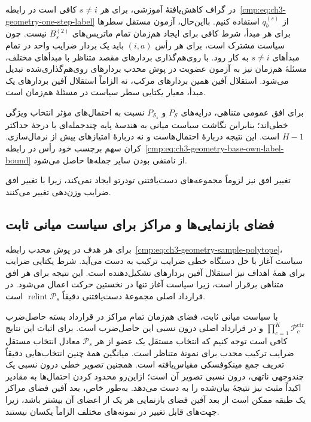 در گراف کاهش‌یافتهٔ آموزشی، برای هر $s\ne i$ کافی است در رابطه~\eqref{cmp:eq:ch3-geometry-one-step-label} از $q_b^{(s)}$ استفاده کنیم. بااین‌حال، آزمون مستقل سطرها برای هر مبدأ، شرط کافی برای ایجاد هم‌زمان تمام ماتریس‌های $B_s^{(2)}$ نیست. چون سیاست مشترک است، برای هر رأس $(i,a)$ باید یک بردار ضرایب واحد در تمام مبدأهای $s\ne i$ به کار رود. با روی‌هم‌گذاری بردارهای مقصد متناظر با مبدأهای مختلف، مسئلهٔ هم‌زمان نیز به آزمون عضویت در پوش محدب بردارهای روی‌هم‌گذاری‌شده تبدیل می‌شود. استقلال آفین همین بردارهای مرکب، نه الزاماً استقلال آفین بردارهای یک مبدأ، معیار یکتایی سطر سیاست در مسئلهٔ هم‌زمان است.

برای افق عمومی متناهی، درایه‌های $P_{\mathcal S}$ و $P_{\mathcal S_s}$ نسبت به احتمال‌های مؤثر انتخاب ویژگی خطی‌اند؛ بنابراین نگاشت سیاست میانی به هندسهٔ پایه چندجمله‌ای با درجهٔ حداکثر $H-1$ است. این نتیجه دربارهٔ احتمال‌هاست و نه دربارهٔ امتیازهای پیش از نرمال‌سازی. کران سهم برچسب خود رأس در رابطه~\eqref{cmp:eq:ch3-geometry-base-own-label-bound} از نامنفی بودن سایر جمله‌ها حاصل می‌شود.

تغییر افق نیز لزوماً مجموعه‌های دست‌یافتنی تودرتو ایجاد نمی‌کند، زیرا با تغییر افق ضرایب وزن‌دهی تغییر می‌کنند.

\subsection{فضای بازنمایی‌ها و مراکز برای سیاست میانی ثابت}
برای هر هدف در پوش محدب رابطه~\eqref{cmp:eq:ch3-geometry-sample-polytope}، سیاست آغاز با حل دستگاه خطی ضرایب ترکیب به دست می‌آید. شرط یکتایی ضرایب برای همهٔ اهداف نیز استقلال آفین بردارهای تشکیل‌دهنده است. این نتیجه برای هر افق متناهی برقرار است، زیرا سیاست آغاز تنها در نخستین حرکت اعمال می‌شود. در قرارداد اصلی مجموعهٔ دست‌یافتنی دقیقاً $\operatorname{relint}\mathcal P_s$ است.

با سیاست میانی ثابت، فضای هم‌زمان تمام مراکز در قرارداد بسته حاصل‌ضرب $\prod_{c=1}^K\mathcal P_c^{\mathrm{ctr}}$ و در قرارداد اصلی درون نسبی این حاصل‌ضرب است. برای اثبات این نتایج کافی است توجه کنیم که انتخاب مستقل یک عضو از هر $\mathcal P_s$ معادل انتخاب مستقل ضرایب ترکیب محدب برای نمونهٔ متناظر است. میانگین همهٔ چنین انتخاب‌هایی دقیقاً تعریف جمع مینکوفسکی مقیاس‌یافته است. همچنین تصویر خطی درون نسبی یک چندوجهی ناتهی، درون نسبی تصویر آن است؛ ازاین‌رو محدود کردن احتمال‌ها به مقادیر اکیداً مثبت نیز نتیجهٔ بیان‌شده را به دست می‌دهد. به‌طور خاص، بعد آفین فضای مراکز یک طبقه ممکن است از بعد آفین فضای بازنمایی هر یک از اعضای آن بیشتر باشد، زیرا جهت‌های قابل تغییر در نمونه‌های مختلف الزاماً یکسان نیستند.


